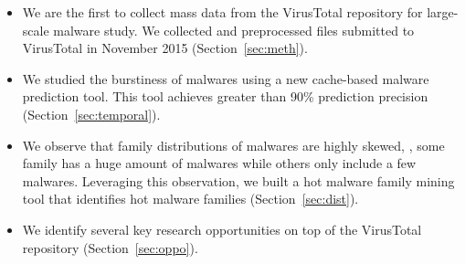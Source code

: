 \begin{itemize}

\item We are the first to collect mass data from the VirusTotal repository for large-scale malware study.
We collected and preprocessed files submitted to VirusTotal in November 2015 (Section~\ref{sec:meth}).

\item We studied the burstiness of malwares using a new 
cache-based malware prediction tool.
This tool achieves greater than 90\% prediction precision (Section~\ref{sec:temporal}). 

\item We observe that family distributions of malwares are highly skewed, 
\ie, some family has a huge amount of malwares while others only include a few malwares. 
Leveraging this observation, we built a hot malware family mining tool that identifies hot 
malware families (Section~\ref{sec:dist}).

\item We identify several key research opportunities on top of the VirusTotal repository (Section~\ref{sec:oppo}). 

\end{itemize}


